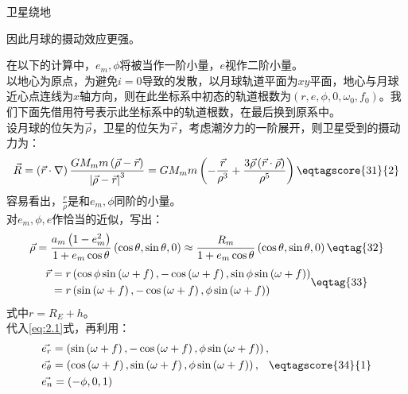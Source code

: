 \documentclass[answer]{cphos}
\begin{document}
\begin{problem}[50]{卫星绕地}
\begin{solution}
因此月球的摄动效应更强。

在以下的计算中，$e_m, \phi$将被当作一阶小量，$e$视作二阶小量。\\
以地心为原点，为避免$i=0$导致的发散，以月球轨道平面为$xy$平面，地心与月球近心点连线为$x$轴方向，则在此坐标系中初态的轨道根数为$\left(r, e, \phi, 0, \omega_0, f_0\right)$。我们下面先借用符号表示此坐标系中的轨道根数，在最后换到原系中。\\
设月球的位矢为$\vec{\rho}$，卫星的位矢为$\vec{r}$，考虑潮汐力的一阶展开，则卫星受到的摄动力为：
\begin{equation}
	\vec{R}=\left(\vec{r}\cdot\nabla\right)\frac{GM_{m}m\left(\vec{\rho}-\vec{r}\right)}{\left|\vec{\rho}-\vec{r}\right|^3}=GM_{m}m\left(-\frac{\vec{r}}{\rho^3}+\frac{3\vec{\rho}\left(\vec{r}\cdot\vec{\rho}\right)}{\rho^5}\right) \eqtagscore{31}{2} \label{eq:2.1}
\end{equation}
容易看出，$\frac{r}{\rho}$是和$e_m, \phi$同阶的小量。\\
对$e_m, \phi, e$作恰当的近似，写出：
\begin{equation}
	\vec{\rho}=\frac{a_m\left(1-e_m^2\right)}{1+e_m\cos\theta}\left(\cos\theta,\sin\theta,0\right)\approx\frac{R_m}{1+e_m\cos\theta}\left(\cos\theta,\sin\theta,0\right)
	\eqtag{32}
\end{equation}
\begin{equation}
	\begin{aligned}
		\vec{r}&=r\left(\cos\phi\sin\left(\omega+f\right),-\cos\left(\omega+f\right),\sin\phi\sin\left(\omega+f\right)\right)\\
		&=r\left(\sin\left(\omega+f\right),-\cos\left(\omega+f\right),\phi\sin\left(\omega+f\right)\right)
	\end{aligned}\eqtag{33}
\end{equation}
式中$r=R_E+h$。\\ 
代入\ref{eq:2.1}式，再利用：
\begin{equation}
	\begin{aligned}
		&\vec{e_r}=\left(\sin\left(\omega+f\right),-\cos\left(\omega+f\right),\phi\sin\left(\omega+f\right)\right),\\
		&\vec{e_{\theta}}=\left(\cos\left(\omega+f\right),\sin\left(\omega+f\right),\phi\sin\left(\omega+f\right)\right),\\
		&\vec{e_n}=\left(-\phi,0,1\right)
	\end{aligned} \eqtagscore{34}{1}
\end{equation}


\end{solution}
\end{problem}
\end{document}
